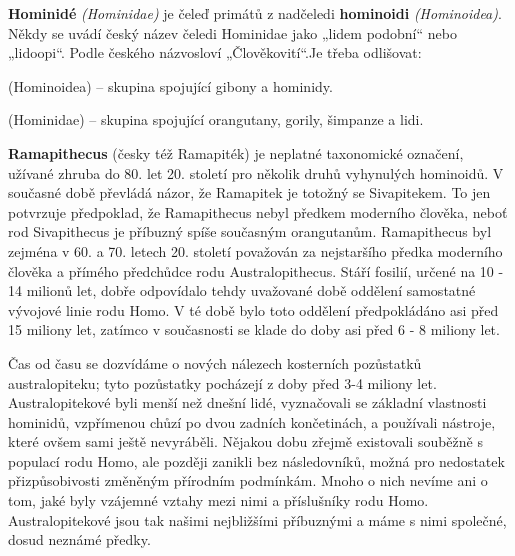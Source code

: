         \begin{tcnote}
          \textbf{Hominidé} \emph{(Hominidae)} je čeleď primátů z nadčeledi \textbf{hominoidi}
          \emph{(Hominoidea)}. Někdy se uvádí český název čeledi Hominidae jako „lidem podobní“ nebo
          „lidoopi“. Podle českého názvosloví „Člověkovití“.Je třeba odlišovat:
          \begin{description}[leftmargin=8em,labelindent=1em, style=nextline]
            \item[\textbf{Hominoidi}] (Hominoidea) – skupina spojující gibony a hominidy.
            \item[\textbf{Hominidé}] (Hominidae) – skupina spojující orangutany, gorily, šimpanze a
              lidi.
          \end{description}

          \textbf{Ramapithecus} (česky též Ramapiték) je neplatné taxonomické označení, užívané
          zhruba do 80. let 20. století pro několik druhů vyhynulých hominoidů. V současné době
          převládá názor, že Ramapitek je totožný se Sivapitekem. To jen potvrzuje předpoklad, že
          Ramapithecus nebyl předkem moderního člověka, neboť rod Sivapithecus je příbuzný spíše
          současným orangutanům. Ramapithecus byl zejména v 60. a 70. letech 20. století považován
          za nejstaršího předka moderního člověka a přímého předchůdce rodu Australopithecus. Stáří
          fosilií, určené na 10 - 14 milionů let, dobře odpovídalo tehdy uvažované době oddělení
          samostatné vývojové linie rodu Homo. V té době bylo toto oddělení předpokládáno asi před
          15 miliony let, zatímco v současnosti se klade do doby asi před 6 - 8 miliony let.
        \end{tcnote}

        Čas od času se dozvídáme o nových nálezech kosterních pozůstatků australopiteku; tyto
        pozůstatky pocházejí z doby před 3-4 miliony let. Australopitekové byli menší než dnešní
        lidé, vyznačovali se základní vlastnosti hominidů, vzpřímenou chůzí po dvou zadních
        končetinách, a používali nástroje, které ovšem sami ještě nevyráběli. Nějakou dobu zřejmě
        existovali souběžně s populací rodu Homo, ale později zanikli bez následovníků, možná pro
        nedostatek přizpůsobivosti změněným přírodním podmínkám. Mnoho o nich nevíme ani o tom, jaké
        byly vzájemné vztahy mezi nimi a příslušníky rodu Homo. Australopitekové jsou tak našimi
        nejbližšími příbuznými a máme s nimi společné, dosud neznámé předky.

